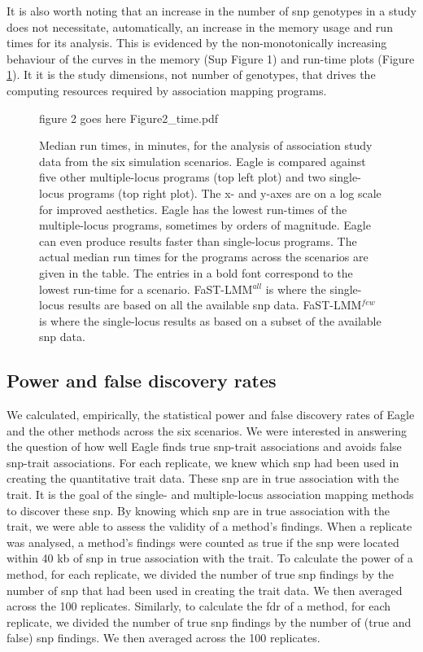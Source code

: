 \documentclass{nature}
\begin{document}
  
 It is also worth noting that an increase in the number of snp genotypes in a study does not necessitate, automatically,  
 an increase in the memory usage and run times for its analysis. This is  evidenced by the non-monotonically 
 increasing behaviour of the curves in the memory (Sup Figure 1) and run-time plots (Figure \ref{fig_time}).  It 
it is the study dimensions, not number of genotypes, that drives the computing resources required by 
association mapping programs.   
 
  
\begin{figure}
\caption{Median run times, in minutes, for the analysis of association study data from the six simulation scenarios. 
Eagle is compared against five other multiple-locus programs (top left plot) and two single-locus programs (top right plot). 
The x- and y-axes are on a log scale for improved aesthetics. Eagle has the lowest run-times of the multiple-locus 
programs, sometimes by orders of magnitude. Eagle can even produce results faster than single-locus programs. 
The actual median run times for the programs across the scenarios are given in the table. The entries in a bold font 
correspond to the lowest run-time for a scenario. 
 FaST-LMM$^{all}$ is where the single-locus results are based on all the available 
snp data. FaST-LMM$^{few}$ is where the single-locus results as based on a subset of the available snp data. }

\label{fig_time}
figure 2 goes here {Figure2_time.pdf}
\end{figure}




\subsection{Power and false discovery rates}

We calculated, empirically, the statistical power and false discovery rates of Eagle and the other methods across the six scenarios. 
We were interested in answering the question of how well Eagle finds true snp-trait associations and avoids false snp-trait associations. 
For each replicate, we knew which snp had been used in creating the quantitative trait data. These snp are in true association with 
the trait. It is the goal of the single- and multiple-locus association mapping methods to discover these snp. By knowing which snp are in true 
association with the trait, we were able to assess the validity of a  method's findings. When a replicate was analysed, 
 a method's findings were counted as true if the snp were located within 40 kb of snp in true 
association with the trait. To calculate the power of a method, for each replicate, we divided the number of true snp findings by the number of snp that had been used 
in creating the trait data. We then averaged across the 100 replicates.  Similarly, to calculate the fdr of a method, for each replicate, 
we divided the number of true snp findings by the number of (true and false) snp findings. We then averaged across the 100 replicates.  
\end{document}
